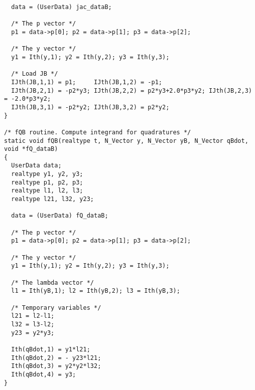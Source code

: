 \begin{verbatim}
  data = (UserData) jac_dataB;

  /* The p vector */
  p1 = data->p[0]; p2 = data->p[1]; p3 = data->p[2];

  /* The y vector */
  y1 = Ith(y,1); y2 = Ith(y,2); y3 = Ith(y,3);

  /* Load JB */
  IJth(JB,1,1) = p1;     IJth(JB,1,2) = -p1; 
  IJth(JB,2,1) = -p2*y3; IJth(JB,2,2) = p2*y3+2.0*p3*y2; IJth(JB,2,3) = -2.0*p3*y2;
  IJth(JB,3,1) = -p2*y2; IJth(JB,3,2) = p2*y2;
}

/* fQB routine. Compute integrand for quadratures */
static void fQB(realtype t, N_Vector y, N_Vector yB, N_Vector qBdot, void *fQ_dataB)
{
  UserData data;
  realtype y1, y2, y3;
  realtype p1, p2, p3;
  realtype l1, l2, l3;
  realtype l21, l32, y23;

  data = (UserData) fQ_dataB;

  /* The p vector */
  p1 = data->p[0]; p2 = data->p[1]; p3 = data->p[2];

  /* The y vector */
  y1 = Ith(y,1); y2 = Ith(y,2); y3 = Ith(y,3);
  
  /* The lambda vector */
  l1 = Ith(yB,1); l2 = Ith(yB,2); l3 = Ith(yB,3);

  /* Temporary variables */
  l21 = l2-l1;
  l32 = l3-l2;
  y23 = y2*y3;

  Ith(qBdot,1) = y1*l21;
  Ith(qBdot,2) = - y23*l21;
  Ith(qBdot,3) = y2*y2*l32;
  Ith(qBdot,4) = y3;
}
\end{verbatim}